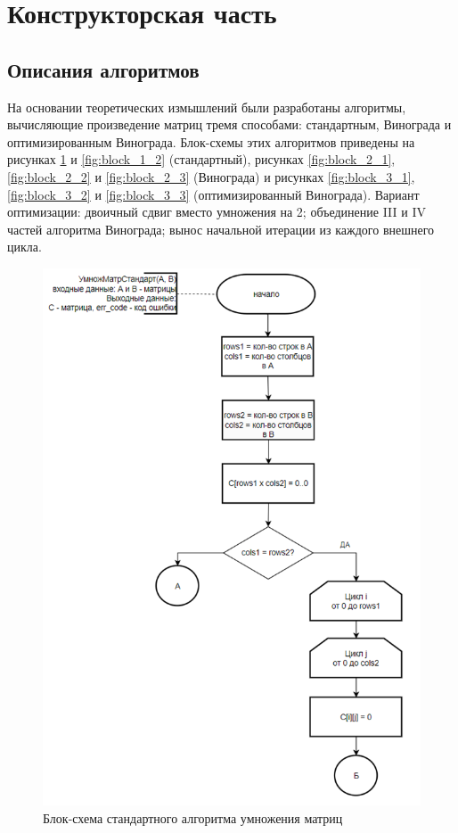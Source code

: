 \section{Конструкторская часть}
\subsection{Описания алгоритмов}

\hspace{1.25cm}
На основании теоретических измышлений были разработаны алгоритмы, вычисляющие произведение матриц тремя способами: стандартным, Винограда и оптимизированным Винограда. Блок-схемы этих алгоритмов приведены на рисунках \ref{fig:block_1_1} и \ref{fig:block_1_2} (стандартный), рисунках \ref{fig:block_2_1}, \ref{fig:block_2_2} и \ref{fig:block_2_3} (Винограда) и рисунках \ref{fig:block_3_1}, \ref{fig:block_3_2} и \ref{fig:block_3_3} (оптимизированный Винограда). Вариант оптимизации: двоичный сдвиг вместо умножения на 2; объединение III и IV частей алгоритма Винограда; вынос начальной итерации из каждого внешнего цикла.

\begin{figure}[H]
    \centering
    \includegraphics[width=1\textwidth]{img/block_1_1.png}
    \caption{Блок-схема стандартного алгоритма умножения матриц}
    \label{fig:block_1_1}
\end{figure}


